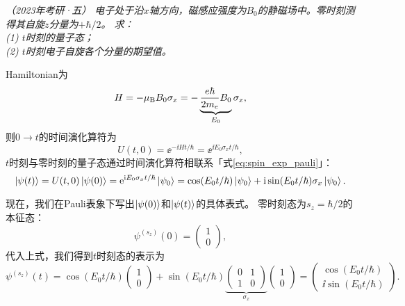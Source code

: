 \begin{tcolorbox}[breakable, title={\textbf{例题：Larmor进动}}]
    \it\small
     （2023年考研·五）
    电子处于沿$x$轴方向，磁感应强度为$B_0$的静磁场中。零时刻测得其自旋$z$分量为$+\hbar/2$。
    求：\\
    (1) $t$时刻的量子态；\\
    (2) $t$时刻电子自旋各个分量的期望值。

    Hamiltonian为
    \begin{equation}
        H = -\mu_{\rm{B}} B_0 \sigma_x = - \underbrace{\frac{e\hbar}{2m_e} B_0}_{E_0} \sigma_x,
    \end{equation}
    则$0\rightarrow t$的时间演化算符为
    \begin{equation}
        U(t,0) = \ee^{-\ii H t/\hbar} = \ee^{\ii E_0 \sigma_x t/\hbar},
    \end{equation}
    $t$时刻与零时刻的量子态通过时间演化算符相联系「式\eqref{eq:spin_exp_pauli}」：
    \begin{equation}
        \ket{\psi(t)} = U(t,0) \ket{\psi(0)} = \ee^{\ii E_0 \sigma_x t/\hbar} \ket{\psi_0}
        = \cos(E_0 t/\hbar)\ket{\psi_0} + \ii\sin(E_0 t/\hbar) \sigma_x \ket{\psi_0}.
    \end{equation}

    现在，我们在Pauli表象下写出$\ket{\psi(0)}$和$\ket{\psi(t)}$的具体表式。
    零时刻态为$s_z=\hbar/2$的本征态：
    \begin{equation}
        \psi^{(s_z)}(0) = \begin{pmatrix} 1 \\ 0 \end{pmatrix},
    \end{equation}
    代入上式，我们得到$t$时刻态的表示为
    \begin{equation}
        \psi^{(s_z)}(t) = \cos(E_0 t/\hbar)\begin{pmatrix} 1 \\ 0 \end{pmatrix} + \sin(E_0 t/\hbar) \underbrace{\begin{pmatrix} 0 & 1 \\ 1 & 0 \end{pmatrix}}_{\sigma_x} \begin{pmatrix} 1 \\ 0 \end{pmatrix}
        = \begin{pmatrix} \cos(E_0 t/\hbar) \\ \ii\sin(E_0 t/\hbar) \end{pmatrix}.
    \end{equation}


\end{tcolorbox}
